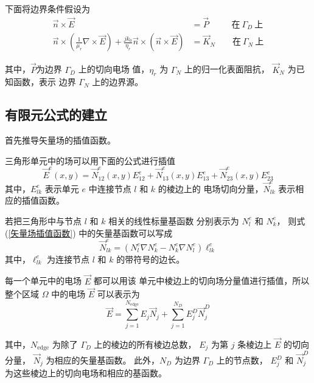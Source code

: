 \par 下面将边界条件假设为
\begin{align}
    \label{矢量场边界条件-1}
    \vec{n}\times\vec{E}&=\vec{P}
    \ \ \ \qquad \text{在}\ \Gamma_D\ \text{上}\\
    \label{矢量场边界条件-2}
    \vec{n}\times\left(
        \frac{1}{\mu_r}\nabla\times\vec{E}
    \right)
    +\frac{jk_0}{\eta_r}
    \vec{n}\times(\vec{n}\times\vec{E})
    &=\vec{K}_N
    \qquad \text{在}\ \Gamma_N\ \text{上}
\end{align}
\par 其中，$\vec{P}$为边界 $\Gamma_D$ 上的切向电场
值，$\eta_r$ 为 $\Gamma_N$ 上的归一化表面阻抗，
$\vec{K}_N$ 为已知函数，表示
边界 $\Gamma_N$ 上的边界源。

\subsection{有限元公式的建立}

\par 首先推导矢量场的插值函数。

\begin{theorem}
    三角形单元中的场可以用下面的公式进行插值
    \begin{equation}
        \vec{E}^e(x,y)=\vec{N}_{12}^e(x,y)E_{12}^e
        +\vec{N}_{13}^e(x,y)E_{13}^e
        +\vec{N}_{23}^e(x,y)E_{23}^e
        \label{矢量场插值函数}
    \end{equation}
    其中，$E_{lk}^e$ 表示单元 $e$ 中连接节点 $l$ 和 $k$ 的棱边上的
    电场切向分量，$\vec{N}_{lk}^e$ 表示相应的插值函数。
    
    若把三角形中与节点 $l$ 和 $k$ 相关的线性标量基函数
    分别表示为 $N_l^e$ 和 $N_k^e$，
    则式 (\ref{矢量场插值函数}) 中的矢量基函数可以写成
    \begin{equation}
        \vec{N}_{lk}^e
        =(N_l^e\nabla N_k^e-N_k^e\nabla N_l^e)\ell_{lk}^e
    \end{equation}
    其中，$\ell_{lk}^e$ 为连接节点 $l$ 和 $k$ 的带符号的边长。
\end{theorem}

\par 每一个单元中的电场 $\vec{E}$ 都可以用该
单元中棱边上的切向场分量值进行插值，所以
整个区域 $\Omega$ 中的电场 $\vec{E}$ 可以表示为
\begin{equation}
    \vec{E}=\sum_{j=1}^{N_{\text{edge}}}  E_j \vec{N}_j
    +\sum_{j=1}^{N_D} E_j^D \vec{N}_j^D
\end{equation}
\par 其中，$N_{\text{edge}}$ 为除了 $\Gamma_D$ 上的棱边的所有棱边总数，
$E_j$ 为第 $j$ 条棱边上 $\vec{E}$ 的切向分量，
$\vec{N}_j$ 为相应的矢量基函数。
此外，$N_D$ 为边界 $\Gamma_D$ 上的节点数，
$E_j^D$ 和 $\vec{N}_j^D$ 为这些棱边上的切向电场和相应的基函数。

